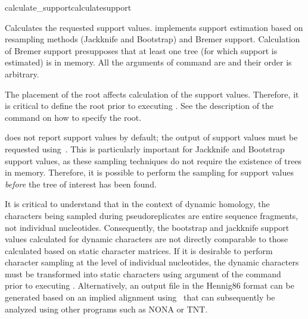 \begin{command}{calculate\_support}{calculatesupport}


	\begin{poydescription} 
            Calculates the requested support values. \poy implements support
            estimation based on resampling methods (Jackknife and Bootstrap) and
            Bremer support. Calculation of Bremer support presupposes that at least one
            tree (for which support is estimated) is in memory.
            All the arguments of  command are and
            their order is arbitrary.
            
            \begin{statement}
  	  The placement of the root affects calculation of the support values.
	  Therefore, it is critical to define the root prior to executing
	  . See the description of the
	  command  on how to specify the root.
	\end{statement}

            \poy does not report support values by default; the output of
            support values must be requested using~. 
            This is particularly important for
            Jackknife and Bootstrap support values, as these sampling techniques
            do not require the existence of trees in memory. Therefore, it is
            possible to perform the sampling for support values \emph{before}
            the tree of interest has been found.
            
            \begin{statement}
                It is critical to understand that in the context of dynamic
                homology, the characters being sampled during pseudoreplicates
                are entire sequence fragments, not individual nucleotides.
                Consequently, the bootstrap and jackknife support values
                calculated for dynamic characters are not directly comparable to
                those calculated based on static character matrices. If it is
                desirable to perform character sampling at the level of
                individual nucleotides, the dynamic characters must be
                transformed into static characters using 
                argument of the command~
                prior to executing .
                Alternatively, an output file in the Hennig86 format can be
                generated based on an implied alignment
                using~ that can subsequently be analyzed
                using other programs such as NONA or TNT.
                

\end{statement}
\end{poydescription}
\end{command}
